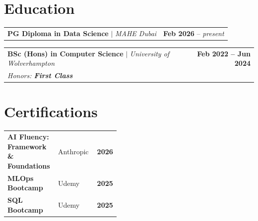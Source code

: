 \documentclass[a4paper,10.5pt]{article}
\begin{document}
\section{Education}

\vspace{5pt}

\begin{tabularx}{\linewidth}{@{}X r@{}}
\textbf{PG Diploma in Data Science} $|$ \normalfont\textit{MAHE Dubai} & \textbf{Feb 2026} -- \textit{present} \\
\end{tabularx}

\begin{tabularx}{\linewidth}{@{}X r@{}}
\textbf{BSc (Hons) in Computer Science} $|$ \normalfont\textit{University of Wolverhampton} & \textbf{Feb 2022 -- Jun 2024} \\
\textit{Honors: \textbf{First Class}} &  \\
\end{tabularx}

\section{Certifications}

\vspace{5pt}

\begin{tabularx}{\linewidth}{@{}p{0.45\linewidth} >{\raggedright\arraybackslash}X r@{}}
\textbf{AI Fluency: Framework \& Foundations}     & Anthropic & \textbf{2026} \\
\textbf{MLOps Bootcamp}                           & Udemy     & \textbf{2025} \\
\textbf{SQL Bootcamp}                             & Udemy     & \textbf{2025}
\end{tabularx}

\vfill
\end{document}
